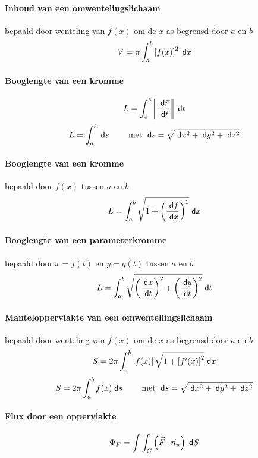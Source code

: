 \paragraph{Inhoud van een omwentelingslichaam}
\label{sec:InhoudOmwentelingslichaam}
bepaald door wenteling van $f(x)$ om de $x$-as begrensd door $a$ en $b$
\[
 V = \pi\int_a^b \left[f(x)\right]^2 \;\textsf{d}x
\]

\paragraph{Booglengte van een kromme}
\label{sec:BooglengteKrommeAlg}
\[
  L = \int_a^b \left\| \frac{\;\textsf{d}\vec{r}}{\;\textsf{d}t}\right\| \;\textsf{d}t
\]
\[
 L = \int_a^b \;\textsf{d}s \qquad \mbox{ met } \;\textsf{d}s = \sqrt{\;\textsf{d}x^2 + \;\textsf{d}y^2 + \;\textsf{d}z^2}
\]

\paragraph{Booglengte van een kromme}
\label{sec:BooglengteKromme}
bepaald door $f(x)$ tussen $a$ en $b$
\[
 L = \int_a^b \sqrt{1+\left(\frac{\;\textsf{d}f}{\;\textsf{d}x}\right)^2} \;\textsf{d}x
\]


\paragraph{Booglengte van een parameterkromme}
\label{sec:BooglengteParameterKromme}
bepaald door $x= f(t)$ en $y=g(t)$ tussen $a$ en $b$
\[
 L = \int_a^b \sqrt{\left(\frac{\;\textsf{d}x}{\;\textsf{d}t}\right)^2 + \left(\frac{\;\textsf{d}y}{\;\textsf{d}t}\right)^2} \;\textsf{d}t
\]


\paragraph{Manteloppervlakte van een omwentellingslichaam}
\label{sec:ManteloppervlakteOmwentellingslichaam}
bepaald door wenteling van $f(x)$ om de $x$-as begrensd door $a$ en $b$
\[
 S = 2\pi\int_a^b \left|f(x)\right| \sqrt{1+\left[f'(x)\right]^2} \;\textsf{d}x
\]
\[
 S = 2 \pi \int_a^b f(x) \;\textsf{d}s \qquad \mbox{ met } \;\textsf{d}s = \sqrt{\;\textsf{d}x^2 + \;\textsf{d}y^2 + \;\textsf{d}z^2}
\]

\paragraph{Flux door een oppervlakte}
\label{sec:FluxOpp}
\[
  \Phi_F = \int\int_G \left( \vec{F} \cdot \vec{n}_u \right) \;\textsf{d}S
\]


